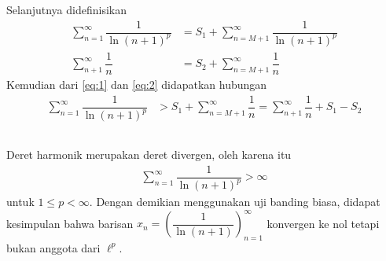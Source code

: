 \documentclass[aspectratio=169]{beamer}
\theoremstyle{definition}
\begin{document}
\begin{frame}
  \frametitle{\insertsection}
  \framesubtitle{\insertsubsection}
  Selanjutnya didefinisikan
  \begin{align}
    \sum_{n=1}^\infty \dfrac{1}{\ln(n+1)^p} &= S_1 + \sum_{n=M+1}^\infty \dfrac{1}{\ln(n+1)^p}\label{eq:1}\\
    \sum_{n+1}^\infty \dfrac{1}{n} &= S_2 + \sum_{n=M+1}^\infty \dfrac{1}{n}\label{eq:2}
  \end{align}
  Kemudian dari \eqref{eq:1} dan \eqref{eq:2} didapatkan hubungan
  \begin{align*}
    \sum_{n=1}^\infty \dfrac{1}{\ln(n+1)^p} &> S_1 + \sum_{n=M+1}^\infty \dfrac{1}{n}= \sum_{n+1}^\infty \dfrac{1}{n} +S_1 - S_2\\
  \end{align*}
\end{frame}

\begin{frame}
  \frametitle{\insertsection}
  \framesubtitle{\insertsubsection}
  Deret harmonik merupakan deret divergen, oleh karena itu 
  \begin{align*}
    \sum_{n=1}^\infty \dfrac{1}{\ln(n+1)^p} > \infty
  \end{align*}
  untuk $1 \leq p < \infty$. Dengan demikian menggunakan uji banding biasa, didapat kesimpulan bahwa barisan \( x_n = \left( \dfrac{1}{\ln(n+1)} \right)_{n=1}^\infty \) konvergen ke nol tetapi bukan anggota dari \( \ell^p \).
\end{frame}
\end{document}
